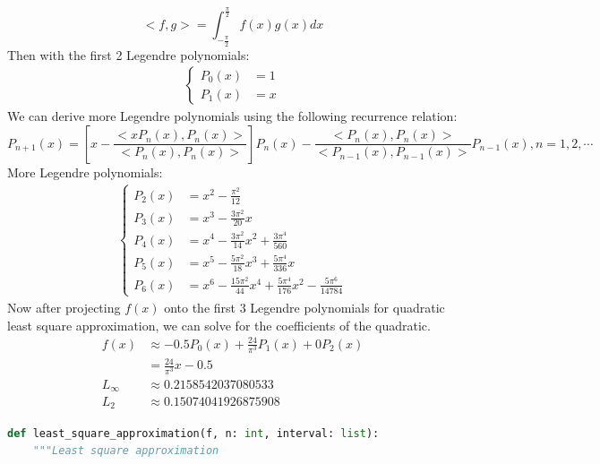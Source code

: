\documentclass[conference,onecolumn]{IEEEtran}
\begin{document}
\begin{enumerate}[label=\arabic{enumi}.]
\begin{enumerate}
                        $$
                              <f, g> = \int_{-\frac{\pi}{2}}^{\frac{\pi}{2}} f(x) g(x) dx
                        $$
                        Then with the first 2 Legendre polynomials:
                        \begin{align*}
                              \begin{cases}
                                    P_0(x) & = 1 \\
                                    P_1(x) & = x
                              \end{cases}
                        \end{align*}
                        We can derive more Legendre polynomials using the following recurrence relation:
                        $$
                              P_{n + 1}(x) = \left[ x - \frac{<x P_n(x), P_n(x)>}{<P_n(x), P_n(x)>}\right] P_n(x) - \frac{<P_n(x), P_n(x)>}{<P_{n - 1}(x), P_{n - 1}(x)>} P_{n - 1}(x), n = 1, 2, \cdots
                        $$
                        More Legendre polynomials:
                        \begin{align*}
                              \begin{cases}
                                    P_2(x) & = x^2 - \frac{\pi^2}{12}                                                       \\
                                    P_3(x) & = x^3 - \frac{3\pi^2}{20} x                                                    \\
                                    P_4(x) & = x^4 - \frac{3\pi^2}{14} x^2 + \frac{3\pi^4}{560}                             \\
                                    P_5(x) & = x^5 - \frac{5\pi^2}{18} x^3 + \frac{5\pi^4}{336} x                           \\
                                    P_6(x) & = x^6 - \frac{15\pi^2}{44} x^4 + \frac{5\pi^4}{176} x^2 - \frac{5\pi^6}{14784}
                              \end{cases}
                        \end{align*}
                        Now after projecting $f(x)$ onto the first 3 Legendre polynomials for quadratic least square approximation, we can solve for the coefficients of the quadratic.
                        \begin{align*}
                              f(x)     & \approx -0.5 P_0(x) + \frac{24}{\pi^3} P_1(x) + 0 P_2(x) \\
                                       & = \frac{24}{\pi^3} x - 0.5                               \\
                              L_\infty & \approx 0.2158542037080533                               \\
                              L_2      & \approx 0.15074041926875908
                        \end{align*}
                        \begin{lstlisting}[language=Python]
def least_square_approximation(f, n: int, interval: list):
    """Least square approximation


\end{lstlisting}
\end{enumerate}
\end{enumerate}
\end{document}
